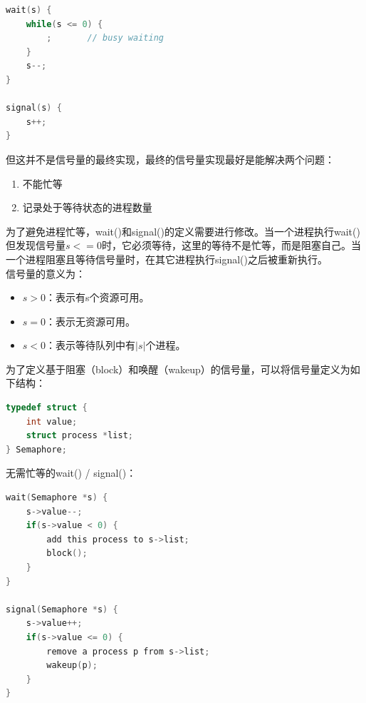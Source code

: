 \vspace{-0.5cm}

\begin{lstlisting}[language=C]
wait(s) {
	while(s <= 0) {
		;		// busy waiting
	}
	s--;
}

signal(s) {
	s++;
}
\end{lstlisting}

但这并不是信号量的最终实现，最终的信号量实现最好是能解决两个问题：

\begin{enumerate}
    \item 不能忙等
    \item 记录处于等待状态的进程数量
\end{enumerate}

为了避免进程忙等，wait()和signal()的定义需要进行修改。当一个进程执行wait()但发现信号量$ s <= 0 $时，它必须等待，这里的等待不是忙等，而是阻塞自己。当一个进程阻塞且等待信号量时，在其它进程执行signal()之后被重新执行。\\

信号量的意义为：

\begin{itemize}
    \item $ s > 0 $：表示有s个资源可用。
    \item $ s = 0 $：表示无资源可用。
    \item $ s < 0 $：表示等待队列中有$ |s| $个进程。
\end{itemize}

为了定义基于阻塞（block）和唤醒（wakeup）的信号量，可以将信号量定义为如下结构：

\vspace{-0.5cm}

\begin{lstlisting}[language=C]
typedef struct {
	int value;
	struct process *list;
} Semaphore;
\end{lstlisting}

无需忙等的wait() / signal()：

\vspace{-0.5cm}

\begin{lstlisting}[language=C]
wait(Semaphore *s) {
	s->value--;
	if(s->value < 0) {
		add this process to s->list;
		block();
	}
}

signal(Semaphore *s) {
	s->value++;
	if(s->value <= 0) {
		remove a process p from s->list;
		wakeup(p);
	}
}
\end{lstlisting}

\newpage

